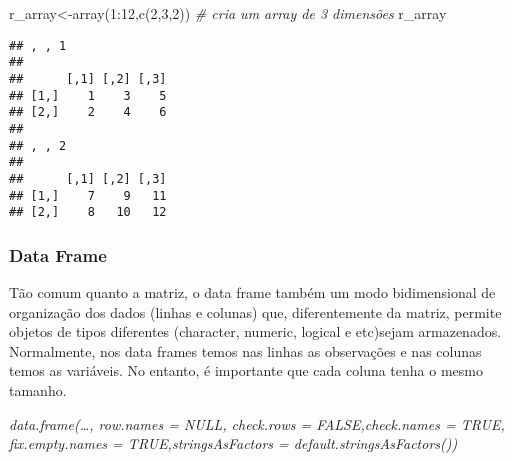 \documentclass[
]{book}
\newenvironment{Shaded}{\begin{snugshade}}{\end{snugshade}}
\newcommand{\CommentTok}[1]{\textcolor[rgb]{0.56,0.35,0.01}{\textit{#1}}}
\newcommand{\DecValTok}[1]{\textcolor[rgb]{0.00,0.00,0.81}{#1}}
\newcommand{\FunctionTok}[1]{\textcolor[rgb]{0.00,0.00,0.00}{#1}}
\newcommand{\NormalTok}[1]{#1}
\newcommand{\OtherTok}[1]{\textcolor[rgb]{0.56,0.35,0.01}{#1}}
\newcommand{\SpecialCharTok}[1]{\textcolor[rgb]{0.00,0.00,0.00}{#1}}
\begin{document}
\begin{Shaded}
\begin{Highlighting}[]
\NormalTok{r\_array}\OtherTok{\textless{}{-}}\FunctionTok{array}\NormalTok{(}\DecValTok{1}\SpecialCharTok{:}\DecValTok{12}\NormalTok{,}\FunctionTok{c}\NormalTok{(}\DecValTok{2}\NormalTok{,}\DecValTok{3}\NormalTok{,}\DecValTok{2}\NormalTok{)) }\CommentTok{\# cria um array de 3 dimensões}
\NormalTok{r\_array}
\end{Highlighting}
\end{Shaded}

\begin{verbatim}
## , , 1
## 
##      [,1] [,2] [,3]
## [1,]    1    3    5
## [2,]    2    4    6
## 
## , , 2
## 
##      [,1] [,2] [,3]
## [1,]    7    9   11
## [2,]    8   10   12
\end{verbatim}

\hypertarget{data-frame}{%
\subsubsection{Data Frame}\label{data-frame}}

Tão comum quanto a matriz, o data frame também um modo bidimensional de organização dos dados (linhas e colunas) que, diferentemente da matriz, permite objetos de tipos diferentes (character, numeric, logical e etc)sejam armazenados.
Normalmente, nos data frames temos nas linhas as observações e nas colunas temos as variáveis.
No entanto, é importante que cada coluna tenha o mesmo tamanho.

\emph{\emph{data.frame(\ldots, row.names = NULL, check.rows = FALSE,check.names = TRUE, fix.empty.names = TRUE,stringsAsFactors = default.stringsAsFactors())}}
\end{document}
